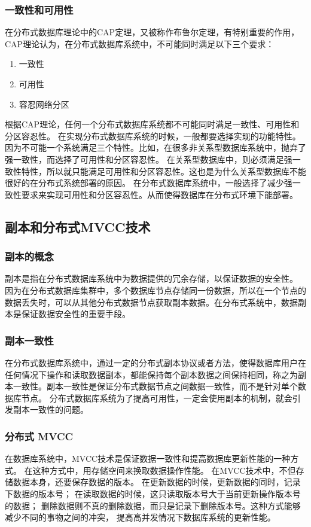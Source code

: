 \subsubsection{一致性和可用性}
在分布式数据库理论中的CAP定理，又被称作布鲁尔定理，有特别重要的作用，
CAP理论认为，在分布式数据库系统中，不可能同时满足以下三个要求：
\begin{enumerate}
	\item 一致性
	\item 可用性
	\item 容忍网络分区
\end{enumerate}
根据CAP理论，任何一个分布式数据库系统都不可能同时满足一致性、可用性和分区容忍性。
在实现分布式数据库系统的时候，一般都要选择实现的功能特性。
因为不可能一个系统满足三个特性。比如，在很多非关系型数据库系统中，抛弃了强一致性，而选择了可用性和分区容忍性。
在关系型数据库中，则必须满足强一致性特性，所以就只能满足可用性和分区容忍性。这也是为什么关系型数据库不能很好的在分布式系统部署的原因。
在分布式数据库系统中，一般选择了减少强一致性要求来实现可用性和分区容忍性。从而使得数据库在分布式环境下能部署。
\subsection{副本和分布式MVCC技术}
\subsubsection{副本的概念}
副本是指在分布式数据库系统中为数据提供的冗余存储，以保证数据的安全性。
因为在分布式数据库集群中，多个数据库节点存储同一份数据，所以在一个节点的数据丢失时，可以从其他分布式数据节点获取副本数据。在分布式系统中，数据副本是保证数据安全性的重要手段。
\subsubsection{副本一致性}
在分布式数据库系统中，通过一定的分布式副本协议或者方法，使得数据库用户在任何情况下操作和读取数据副本，都能保持每个副本数据之间保持相同，称之为副本一致性。副本一致性是保证分布式数据节点之间数据一致性，而不是针对单个数据库节点。
分布式数据库系统为了提高可用性，一定会使用副本的机制，就会引发副本一致性的问题。
\subsubsection{分布式 MVCC}
在数据库系统中，MVCC技术是保证数据一致性和提高数据库更新性能的一种方式。
在这种方式中，用存储空间来换取数据操作性能。
在MVCC技术中，不但存储数据本身，还要保存数据的版本。
在更新数据的时候，更新数据的同时，记录下数据的版本号；
在读取数据的时候，这只读取版本号大于当前更新操作版本号的数据；
删除数据则不真的删除数据，而只是记录下删除版本号。这种方式能够减少不同的事物之间的冲突，
提高高并发情况下数据库系统的更新性能。

